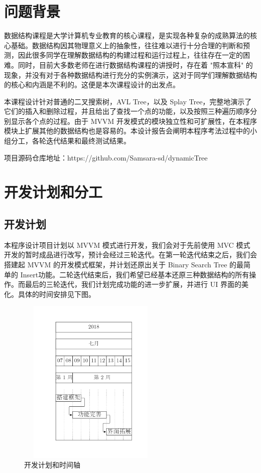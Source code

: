 \documentclass{article}%
\author{3170105785 杨溆峰 $\qquad$ 3170104169 连佳宜 $\qquad$ 3170104559 李举仁}
\date{2019年7月16日}
\begin{document}
	\maketitle
\section{问题背景}	
	\par 数据结构课程是大学计算机专业教育的核心课程，是实现各种复杂的成熟算法的核心基础。数据结构因其物理意义上的抽象性，往往难以进行十分合理的判断和预测，因此很多同学在理解数据结构的构建过程和运行过程上，往往存在一定的困难。同时，目前大多数老师在进行数据结构课程的讲授时，存在着 "照本宣科" 的现象，并没有对于各种数据结构进行充分的实例演示，这对于同学们理解数据结构的核心和内涵是不利的。这便是本次课程设计的出发点。
	\par 本课程设计针对普通的二叉搜索树，AVL Tree，以及 Splay Tree，完整地演示了它们的插入和删除过程，并且给出了查找一个点的功能，以及按照三种遍历顺序分别显示各个点的过程。由于 MVVM 开发模式的模块独立性和可扩展性，在本程序模块上扩展其他的数据结构也是容易的。本设计报告会阐明本程序考法过程中的小组分工，各轮迭代结果和最终测试结果。
	\par 项目源码仓库地址：https://github.com/Samsara-sd/dynamicTree
\section{开发计划和分工}
\subsection{开发计划}
	\par 本程序设计项目计划以 MVVM 模式进行开发，我们会对于先前使用 MVC 模式开发的暂时成品进行改写，预计会经过三轮迭代。在第一轮迭代结束之后，我们会搭建起 MVVM 的开发模式框架，并计划还原出关于 Binary Search Tree 的最简单的 Insert功能。二轮迭代结束后，我们希望已经基本还原三种数据结构的所有操作。而最后的三轮迭代，我们计划完成功能的进一步扩展，并进行 UI 界面的美化。具体的时间安排见下图。
	
\begin{figure}[htbp]
	\centering
	\includegraphics[height=8.0cm,width=7.0cm]{./image/7.png}
	\caption{开发计划和时间轴}
\end{figure}
	
\end{document}
